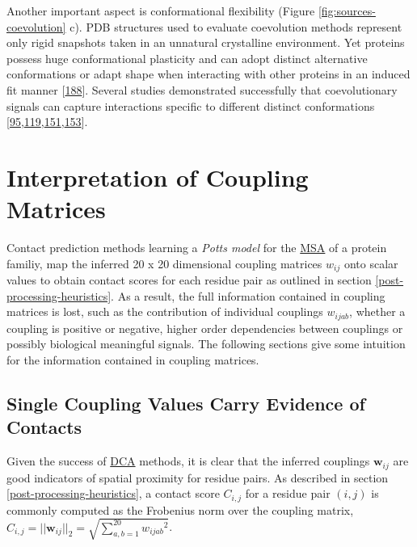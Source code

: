 \documentclass[11pt,a4paper,twoside]{book}
\newcommand{\wij}{\mathbf{w}_{ij}}
\newcommand{\wijab}{w_{ijab}}
\theoremstyle{definition}
\theoremstyle{definition}
\theoremstyle{remark}
\begin{document}
Another important aspect is conformational flexibility (Figure
\ref{fig:sources-coevolution} c). PDB structures used to evaluate
coevolution methods represent only rigid snapshots taken in an unnatural
crystalline environment. Yet proteins possess huge conformational
plasticity and can adopt distinct alternative conformations or adapt
shape when interacting with other proteins in an induced fit manner
{[}\protect\hyperlink{ref-Noel2016}{188}{]}. Several studies
demonstrated successfully that coevolutionary signals can capture
interactions specific to different distinct conformations
{[}\protect\hyperlink{ref-Morcos2011}{95},\protect\hyperlink{ref-Hopf2012}{119},\protect\hyperlink{ref-Sfriso2016}{151},\protect\hyperlink{ref-Jana2014}{153}{]}.

\chapter{Interpretation of Coupling
Matrices}\label{interpreting-coupling-matrices}

Contact prediction methods learning a \emph{Potts model} for the
\protect\hyperlink{abbrev}{MSA} of a protein familiy, map the inferred
20 x 20 dimensional coupling matrices \(w_{ij}\) onto scalar values to
obtain contact scores for each residue pair as outlined in section
\ref{post-processing-heuristics}. As a result, the full information
contained in coupling matrices is lost, such as the contribution of
individual couplings \(\wijab\), whether a coupling is positive or
negative, higher order dependencies between couplings or possibly
biological meaningful signals. The following sections give some
intuition for the information contained in coupling matrices.

\section{Single Coupling Values Carry Evidence of
Contacts}\label{correlation-between-couplings-and-class}

Given the success of \protect\hyperlink{abbrev}{DCA} methods, it is
clear that the inferred couplings \(\wij\) are good indicators of
spatial proximity for residue pairs. As described in section
\ref{post-processing-heuristics}, a contact score \(C_{i,j}\) for a
residue pair \((i,j)\) is commonly computed as the Frobenius norm over
the coupling matrix,
\(C_{i,j}=||\wij||_2 = \sqrt{\sum_{a,b=1}^{20} {\wijab}^2}\).
\end{document}
